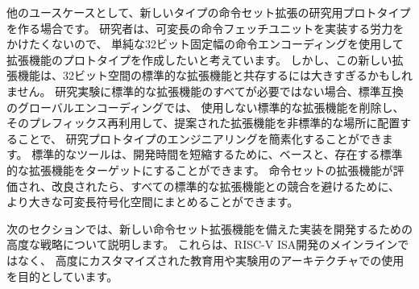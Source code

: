 \begin{comment}
Another use-case is to build a research prototype for a new type of
instruction-set extension.  The researchers might not want to expend
the effort to implement a variable-length instruction-fetch unit, and
so would like to prototype their extension using a simple 32-bit
fixed-width instruction encoding.  However, this new extension might
be too large to coexist with standard extensions in the 32-bit space.
If the research experiments do not need all of the standard
extensions, a standard-compatible global encoding might drop the
unused standard extensions and reuse their prefixes to place the
proposed extension in a non-standard location to simplify engineering
of the research prototype.  Standard tools will still be able to
target the base and any standard extensions that are present to reduce
development time.  Once the instruction-set extension has been
evaluated and refined, it could then be made available for packing
into a larger variable-length encoding space to avoid conflicts with
all standard extensions.
\end{comment}
他のユースケースとして、新しいタイプの命令セット拡張の研究用プロトタイプを作る場合です。
研究者は、可変長の命令フェッチユニットを実装する労力をかけたくないので、
単純な32ビット固定幅の命令エンコーディングを使用して拡張機能のプロトタイプを作成したいと考えています。
しかし、この新しい拡張機能は、32ビット空間の標準的な拡張機能と共存するには大きすぎるかもしれません。
研究実験に標準的な拡張機能のすべてが必要ではない場合、標準互換のグローバルエンコーディングでは、
使用しない標準的な拡張機能を削除し、そのプレフィックス再利用して、提案された拡張機能を非標準的な場所に配置することで、
研究プロトタイプのエンジニアリングを簡素化することができます。
標準的なツールは、開発時間を短縮するために、ベースと、存在する標準的な拡張機能をターゲットにすることができます。
命令セットの拡張機能が評価され、改良されたら、すべての標準的な拡張機能との競合を避けるために、
より大きな可変長符号化空間にまとめることができます。

\begin{comment}
The following sections describe increasingly sophisticated strategies
for developing implementations with new instruction-set extensions.
These are mostly intended for use in highly customized, educational,
or experimental architectures rather than for the main line of RISC-V
ISA development.
\end{comment}
次のセクションでは、新しい命令セット拡張機能を備えた実装を開発するための高度な戦略について説明します。
これらは、RISC-V ISA開発のメインラインではなく、
高度にカスタマイズされた教育用や実験用のアーキテクチャでの使用を目的としています。

